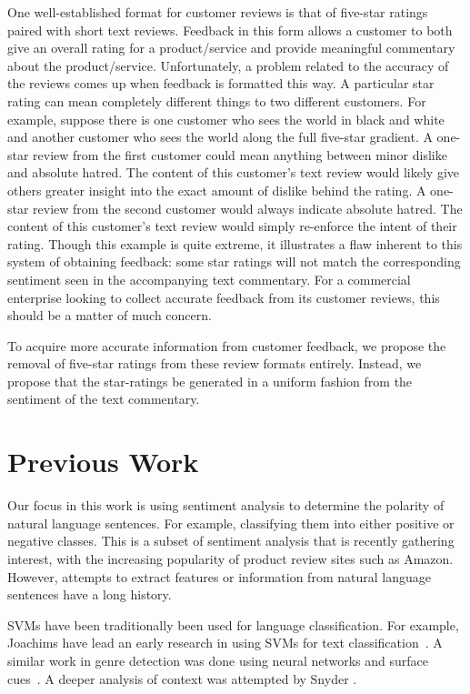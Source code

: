 \documentclass[11pt]{report} %
\begin{document}
One well-established format for customer reviews is that of five-star ratings paired with short text reviews. Feedback in this form allows a customer to both give an overall rating for a product/service and provide meaningful commentary about the product/service. Unfortunately, a problem related to the accuracy of the reviews comes up when feedback is formatted this way. A particular star rating can mean completely different things to two different customers. For example, suppose there is one customer who sees the world in black and white and another customer who sees the world along the full five-star gradient. A one-star review from the first customer could mean anything between minor dislike and absolute hatred. The content of this customer's text review would likely give others greater insight into the exact amount of dislike behind the rating. A one-star review from the second customer would always indicate absolute hatred. The content of this customer's text review would simply re-enforce the intent of their rating. Though this example is quite extreme, it illustrates a flaw inherent to this system of obtaining feedback: some star ratings will not match the corresponding sentiment seen in the accompanying text commentary. For a commercial enterprise looking to collect accurate feedback from its customer reviews, this should be a matter of much concern.

To acquire more accurate information from customer feedback, we propose the removal of five-star ratings from these review formats entirely. Instead, we propose that the star-ratings be generated in a uniform fashion from the sentiment of the text commentary.

\section{Previous Work}

Our focus in this work is using sentiment analysis to determine the polarity of
natural language sentences. For example, classifying them into either positive
or negative classes. This is a subset of sentiment analysis that is recently
gathering interest, with the increasing popularity of product review sites such
as Amazon. However, attempts to extract features or information from natural
language sentences have a long history.

SVMs have been traditionally been used for language classification. For example,
Joachims have lead an early research in using SVMs for text
classification~\cite{Joachims:1998:TCS:645326.649721}. A similar work in genre
detection was done using neural networks and surface
cues~\cite{Kessler:1997:ADT:976909.979622}. A deeper analysis of context was
attempted by Snyder \cite{Snyder07multipleaspect}.
\end{document}
